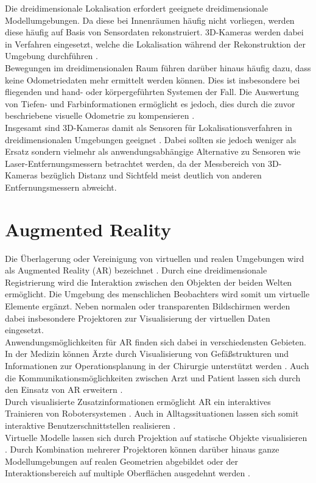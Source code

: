 Die dreidimensionale Lokalisation erfordert geeignete dreidimensionale Modellumgebungen. Da diese bei Innenräumen häufig nicht vorliegen, werden diese häufig auf Basis von Sensordaten rekonstruiert. 3D-Kameras werden dabei in Verfahren eingesetzt, welche die Lokalisation während der Rekonstruktion der Umgebung durchführen \cite{Durrant2006}.\\
Bewegungen im dreidimensionalen Raum führen darüber hinaus häufig dazu, dass keine Odometriedaten mehr ermittelt werden können. Dies ist insbesondere bei fliegenden \cite{Huang2011} und hand- oder körpergeführten Systemen \cite{Fallon2012} der Fall. Die Auswertung von Tiefen- und Farbinformationen ermöglicht es jedoch, dies durch die zuvor beschriebene visuelle Odometrie zu kompensieren \cite{Whelan2013robust}.\\
Insgesamt sind 3D-Kameras damit als Sensoren für Lokalisationsverfahren in dreidimensionalen Umgebungen geeignet \cite{Cunha2011} \cite{Eriksson2012}. 
Dabei sollten sie jedoch weniger als Ersatz sondern vielmehr als anwendungsabhängige Alternative zu Sensoren wie Laser-Entfernungsmessern betrachtet werden, da der Messbereich von 3D-Kameras bezüglich Distanz und Sichtfeld meist deutlich von anderen Entfernungsmessern abweicht.

\section{Augmented Reality}
Die Überlagerung oder Vereinigung von virtuellen und realen Umgebungen wird als Augmented Reality (AR) bezeichnet \cite{Azuma1997}. Durch eine dreidimensionale Registrierung wird die Interaktion zwischen den Objekten der beiden Welten ermöglicht. Die Umgebung des menschlichen Beobachters wird somit um virtuelle Elemente ergänzt. Neben normalen oder transparenten Bildschirmen werden dabei insbesondere Projektoren zur Visualisierung der virtuellen Daten eingesetzt.\\

Anwendungsmöglichkeiten für AR finden sich dabei in verschiedensten Gebieten. In der Medizin können Ärzte durch Visualisierung von Gefäßstrukturen und Informationen zur Operationsplanung in der Chirurgie unterstützt werden \cite{Kobler2010}\cite{Gavaghan2012}. Auch die Kommunikationsmöglichkeiten zwischen Arzt und Patient lassen sich durch den Einsatz von AR erweitern \cite{Bluteau2005}.\\
Durch visualisierte Zusatzinformationen ermöglicht AR ein interaktives Trainieren von Robotersystemen \cite{DeTommaso2012}. Auch in Alltagssituationen lassen sich somit interaktive Benutzerschnittstellen realisieren \cite{Linder2010} \cite{Huber2012}.\\ 
Virtuelle Modelle lassen sich durch Projektion auf statische Objekte visualisieren \cite{Raskar1999}. Durch Kombination mehrerer Projektoren können darüber hinaus ganze Modellumgebungen auf realen Geometrien abgebildet \cite{Low2001} oder der Interaktionsbereich auf multiple Oberflächen ausgedehnt werden \cite{Wilson2010}.

